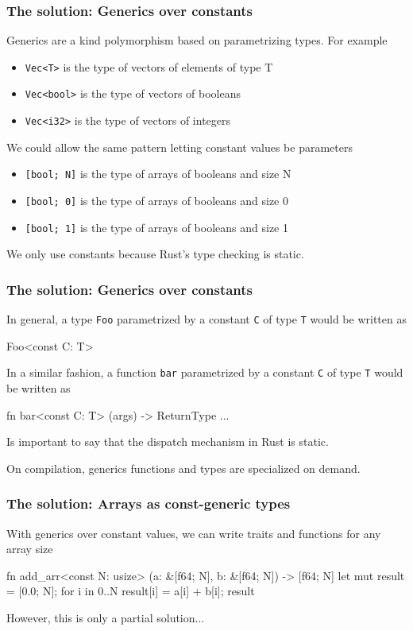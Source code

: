 \documentclass{beamer}
\newcommand{\code}[1] {\texttt{\footnotesize #1}}
\begin{document}
\begin{frame}[fragile]
    \frametitle{The solution: Generics over constants}
    Generics are a kind polymorphism based on parametrizing types. For example
    \begin{itemize}
        \item \code{Vec<T>} is the type of vectors of elements of type T
        \item \code{Vec<bool>} is the type of vectors of booleans
        \item \code{Vec<i32>} is the type of vectors of integers
    \end{itemize}
    We could allow the same pattern letting constant values be parameters
    \begin{itemize}
        \item \code{[bool; N]} is the type of arrays of booleans and size N 
        \item \code{[bool; 0]} is the type of arrays of booleans and size 0 
        \item \code{[bool; 1]} is the type of arrays of booleans and size 1
    \end{itemize}
    We only use constants because Rust's type checking is static.
\end{frame}

\begin{frame}[fragile]
    \frametitle{The solution: Generics over constants}
    In general, a type \code{Foo} parametrized by a constant \code{C} of type \code{T} would be written as
    \begin{rustcode}
        Foo<const C: T>
    \end{rustcode}
    In a similar fashion, a function \code{bar} parametrized by a constant \code{C} of type \code{T} would be written as
    \begin{rustcode}
        fn bar<const C: T> (args) -> ReturnType { ... }
    \end{rustcode}
    Is important to say that the dispatch mechanism in Rust is static. 
    
    On compilation, generics functions and types are specialized on demand.
\end{frame}

\begin{frame}[fragile]
    \frametitle{The solution: Arrays as const-generic types}
    With generics over constant values, we can write traits and functions for any array size
    \begin{rustcode}
    fn add_arr<const N: usize> (a: &[f64; N], b: &[f64; N]) 
    -> [f64; N] {
            let mut result = [0.0; N];
        for i in 0..N {
            result[i] = a[i] + b[i];
        }
        result
    }
    \end{rustcode}
    However, this is only a partial solution...
\end{frame}
\end{document}
